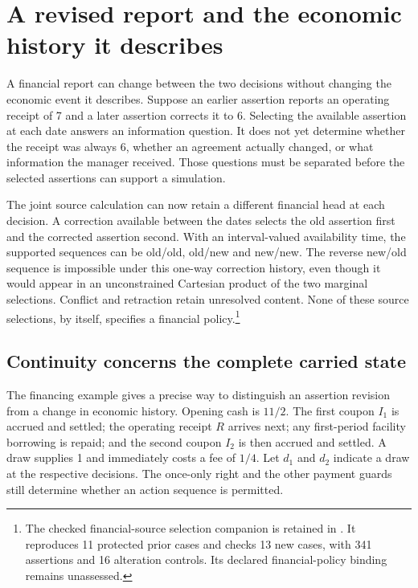 \section{A revised report and the economic history it describes}
\label{sim:financial-source-continuity}

A financial report can change between the two decisions without changing the economic event it describes. Suppose an earlier assertion reports an operating receipt of 7 and a later assertion corrects it to 6. Selecting the available assertion at each date answers an information question. It does not yet determine whether the receipt was always 6, whether an agreement actually changed, or what information the manager received. Those questions must be separated before the selected assertions can support a simulation.

The joint source calculation can now retain a different financial head at each decision. A correction available between the dates selects the old assertion first and the corrected assertion second. With an interval-valued availability time, the supported sequences can be old/old, old/new and new/new. The reverse new/old sequence is impossible under this one-way correction history, even though it would appear in an unconstrained Cartesian product of the two marginal selections. Conflict and retraction retain unresolved content. None of these source selections, by itself, specifies a financial policy.\footnote{The checked financial-source selection companion is retained in . It reproduces 11 protected prior cases and checks 13 new cases, with 341 assertions and 16 alteration controls. Its declared financial-policy binding remains unassessed.}

\subsection{Continuity concerns the complete carried state}

The financing example gives a precise way to distinguish an assertion revision from a change in economic history. Opening cash is $11/2$. The first coupon $I_1$ is accrued and settled; the operating receipt $R$ arrives next; any first-period facility borrowing is repaid; and the second coupon $I_2$ is then accrued and settled. A draw supplies 1 and immediately costs a fee of $1/4$. Let $d_1$ and $d_2$ indicate a draw at the respective decisions. The once-only right and the other payment guards still determine whether an action sequence is permitted.

